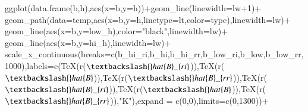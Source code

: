 \documentclass[
  super,
  preprint,
  3p]{elsarticle}
\newenvironment{Shaded}{\begin{snugshade}}{\end{snugshade}}
\newcommand{\AttributeTok}[1]{\textcolor[rgb]{0.40,0.45,0.13}{#1}}
\newcommand{\DecValTok}[1]{\textcolor[rgb]{0.68,0.00,0.00}{#1}}
\newcommand{\FunctionTok}[1]{\textcolor[rgb]{0.28,0.35,0.67}{#1}}
\newcommand{\NormalTok}[1]{\textcolor[rgb]{0.00,0.23,0.31}{#1}}
\newcommand{\SpecialCharTok}[1]{\textcolor[rgb]{0.37,0.37,0.37}{#1}}
\newcommand{\StringTok}[1]{\textcolor[rgb]{0.13,0.47,0.30}{#1}}
\theoremstyle{plain}
\theoremstyle{plain}
\theoremstyle{remark}
\begin{document}
\begin{Shaded}
\begin{Highlighting}[]
\FunctionTok{ggplot}\NormalTok{(}\FunctionTok{data.frame}\NormalTok{(b,h),}\FunctionTok{aes}\NormalTok{(}\AttributeTok{x=}\NormalTok{b,}\AttributeTok{y=}\NormalTok{h))}\SpecialCharTok{+}\FunctionTok{geom\_line}\NormalTok{(}\AttributeTok{linewidth=}\NormalTok{lw}\SpecialCharTok{+}\DecValTok{1}\NormalTok{)}\SpecialCharTok{+}
  \FunctionTok{geom\_path}\NormalTok{(}\AttributeTok{data=}\NormalTok{temp,}\FunctionTok{aes}\NormalTok{(}\AttributeTok{x=}\NormalTok{b,}\AttributeTok{y=}\NormalTok{h,}\AttributeTok{linetype=}\NormalTok{lt,}\AttributeTok{color=}\NormalTok{type),}\AttributeTok{linewidth=}\NormalTok{lw)}\SpecialCharTok{+}
  \FunctionTok{geom\_line}\NormalTok{(}\FunctionTok{aes}\NormalTok{(}\AttributeTok{x=}\NormalTok{b,}\AttributeTok{y=}\NormalTok{low\_h),}\AttributeTok{color=}\StringTok{"black"}\NormalTok{,}\AttributeTok{linewidth=}\NormalTok{lw)}\SpecialCharTok{+}
  \FunctionTok{geom\_line}\NormalTok{(}\FunctionTok{aes}\NormalTok{(}\AttributeTok{x=}\NormalTok{b,}\AttributeTok{y=}\NormalTok{hi\_h),}\AttributeTok{linewidth=}\NormalTok{lw)}\SpecialCharTok{+}
  \FunctionTok{scale\_x\_continuous}\NormalTok{(}\AttributeTok{breaks=}\FunctionTok{c}\NormalTok{(b\_hi\_ri,b\_hi,b\_hi\_rr,b\_low\_ri,b\_low,b\_low\_rr,}\DecValTok{1000}\NormalTok{),}\AttributeTok{labels=}\FunctionTok{c}\NormalTok{(}\FunctionTok{TeX}\NormalTok{(r}\StringTok{\textquotesingle{}($\textbackslash{}hat\{B\}\_\{ri\}$)\textquotesingle{}}\NormalTok{),}\FunctionTok{TeX}\NormalTok{(r}\StringTok{\textquotesingle{}($\textbackslash{}hat\{B\}$)\textquotesingle{}}\NormalTok{),}\FunctionTok{TeX}\NormalTok{(r}\StringTok{\textquotesingle{}($\textbackslash{}hat\{B\}\_\{rr\}$)\textquotesingle{}}\NormalTok{),}\FunctionTok{TeX}\NormalTok{(r}\StringTok{\textquotesingle{}($\textbackslash{}hat\{B\}\_\{ri\}$)\textquotesingle{}}\NormalTok{),}\FunctionTok{TeX}\NormalTok{(r}\StringTok{\textquotesingle{}($\textbackslash{}hat\{B\}$)\textquotesingle{}}\NormalTok{),}\FunctionTok{TeX}\NormalTok{(r}\StringTok{\textquotesingle{}($\textbackslash{}hat\{B\}\_\{rr\}$)\textquotesingle{}}\NormalTok{),}\StringTok{"K"}\NormalTok{),}\AttributeTok{expand =} \FunctionTok{c}\NormalTok{(}\DecValTok{0}\NormalTok{,}\DecValTok{0}\NormalTok{),}\AttributeTok{limits=}\FunctionTok{c}\NormalTok{(}\DecValTok{0}\NormalTok{,}\DecValTok{1300}\NormalTok{))}\SpecialCharTok{+}

\end{Highlighting}
\end{Shaded}
\end{document}
